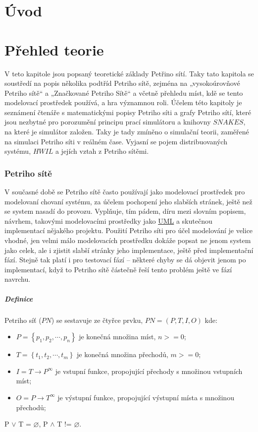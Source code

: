 \chapter{Úvod}
\chapter{Přehled teorie}
\label{prehled}

V teto kapitole jsou popsaný teoretické základy Petřino sítí. Taky tato kapitola se soustředí na popis několika podtříd Petriho sítě, zejména na „vysokoúrovňové Petriho sítě“ a „Značkované Petriho Sítě“ a  včetně přehledu míst, kdě se tento modelovací prostředek používá, a hra významnou roli. Účelem této kapitoly je seznámení čtenáře s matematickými popisy Petriho síti a grafy Petriho sítí, které jsou nezbytné pro porozumění principu prací simulátoru a knihovny $SNAKES$, na které je simulátor založen. Taky je tady zmíněno o simulační teorii, zaměřené na simulaci Petriho síti v reálném čase. Vyjasní se pojem distribuovaných systému, $HWIL$ a jejích vztah z Petriho sítěmi.

\subsection{Petriho sítě}
V současné době se Petriho sítě často používají jako modelovací prostředek pro modelovaní chovaní systému, za účelem pochopení jeho slabších stránek, ještě než se system nasadí do provozu. Vyplňuje, tím pádem, díru mezi slovním popisem, návrhem, takovými modelovacími prostředky jako \href{https://en.wikipedia.org/wiki/Unified_Modeling_Language}{UML} a skutečnou implementací nějakého projektu. Použití Petriho síti pro účel modelování je velice vhodné, jen velmi málo modelovacích prostředku dokáže popsat ne jenom system jako celek, ale i zjistit slabší stránky jeho implementace, ještě před implementační fází. Stejně tak platí i pro testovací fází -- některé chyby se dá objevit jenom po implementací, když to Petriho sítě částečně řeší tento problém ještě ve fází navrchu.

\paragraph{Definice}

Petriho síť ($PN$) se sestavuje ze čtyřce prvku, $PN = \left(P, T, I, O\right)$ kde:
  \begin{itemize}
    \item $P = \left\{p_1, p_2, \cdots , p_n\right\}$ je konečná množina míst, $n >= 0$; \\
    \item $T = \left\{t_1, t_2, \cdots , t_m\right\}$ je konečná množina přechodů, $m >= 0$; \\
    \item $I = T \rightarrow P^\infty$ je vstupní funkce, propojující přechody s množinou vstupních míst; \\
    \item $O = P \rightarrow T^\infty$ je výstupní funkce, propojující výstupní místa s množinou přechodů; \\
  \end{itemize}
P $\vee$ T = $\varnothing$, P $\wedge$ T != $\varnothing$.

